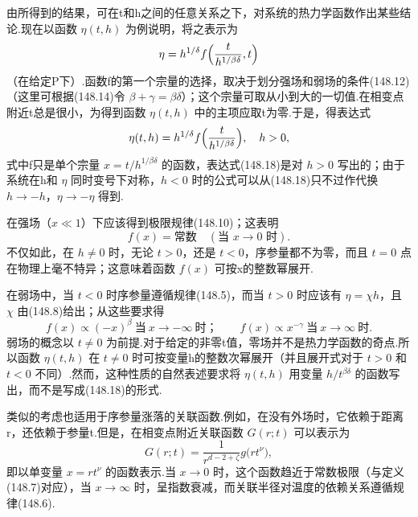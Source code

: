由所得到的结果，可在t和h之间的任意关系之下，对系统的热力学函数作出某些结论.现在以函数 $\eta(t,h)$ 为例说明，将之表示为
\begin{equation*}
  \eta=h^{1/\delta}f\Bigl(\frac{t}{h^{1/\beta\delta}},t\Bigr)
\end{equation*}
（在给定P下）.函数f的第一个宗量的选择，取决于划分强场和弱场的条件(148.12)（这里可根据(148.14)令 $\beta+\gamma=\beta\delta$）；这个宗量可取从小到大的一切值.在相变点附近t总是很小，为得到函数 $\eta(t,h)$ 中的主项应取t为零.于是，得表达式
\begin{equation}
  \eta(t,h)=h^{1/\delta}f\Bigl(\frac{t}{h^{1/\beta\delta}}\Bigr),
  \quad h>0,
\end{equation}
式中f只是单个宗量 $x=t/h^{1/\beta\delta}$ 的函数，表达式(148.18)是对 $h>0$ 写出的；由于系统在h和 $\eta$ 同时变号下对称，$h<0$ 时的公式可以从(148.18)只不过作代换 $h\to-h$，$\eta\to-\eta$ 得到.

在强场（$x\ll1$）下应该得到极限规律(148.10)；这表明
\begin{equation}
  f(x)=\text{常数}\quad(\text{当 }x\to0\text{ 时}).
\end{equation}
不仅如此，在 $h\neq0$ 时，无论 $t>0$，还是 $t<0$，序参量都不为零，而且 $t=0$ 点在物理上毫不特异；这意味着函数 $f(x)$ 可按x的整数幂展开.

在弱场中，当 $t<0$ 时序参量遵循规律(148.5)，而当 $t>0$ 时应该有 $\eta=\chi h$，且 $\chi$ 由(148.8)给出；从这些要求得
\begin{equation}
  f(x)\propto(-x)^{\beta}\ \text{当}\ x\to-\infty\ \text{时；}\qquad
  f(x)\propto x^{-\gamma}\ \text{当}\ x\to\infty\ \text{时.}
\end{equation}
弱场的概念以 $t\neq0$ 为前提.对于给定的非零t值，零场并不是热力学函数的奇点.所以函数 $\eta(t,h)$ 在 $t\neq0$ 时可按变量h的整数次幂展开（并且展开式对于 $t>0$ 和 $t<0$ 不同）.然而，这种性质的自然表述要求将 $\eta(t,h)$ 用变量 $h/t^{\beta\delta}$ 的函数写出，而不是写成(148.18)的形式.

类似的考虑也适用于序参量涨落的关联函数.例如，在没有外场时，它依赖于距离r，还依赖于参量t.但是，在相变点附近关联函数 $G(r;t)$ 可以表示为
\begin{equation}
  G(r;t)=\frac{1}{r^{d-2+\zeta}}g\bigl(rt^{\nu}\bigr),
\end{equation}
即以单变量 $x=rt^{\nu}$ 的函数表示.当 $x\to0$ 时，这个函数趋近于常数极限（与定义(148.7)对应），当 $x\to\infty$ 时，呈指数衰减，而关联半径对温度的依赖关系遵循规律(148.6).

